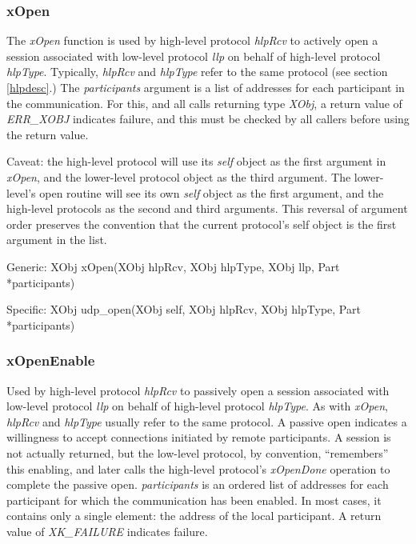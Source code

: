 \subsubsection{xOpen}

\noindent The {\em xOpen} function is used by high-level protocol {\em
hlpRcv} to actively open a session associated with low-level protocol
{\em llp} on behalf of high-level protocol {\em hlpType}. Typically,
{\em hlpRcv} and {\em hlpType} refer to the same protocol 
(see section \ref{hlpdesc}.)  
The {\em participants} 
argument is a list of addresses for each participant in
the communication.  For this, and all calls returning type {\em XObj},
a return value of {\em ERR\_XOBJ} indicates failure, and this must be
checked by all callers before using the return value.

Caveat: the high-level protocol will use its {\em self} object as the
first argument in {\em xOpen}, and the lower-level protocol object as
the third argument.  The lower-level's open routine will see its own
{\em self} object as the first argument, and the high-level protocols
as the second and third arguments.  This reversal of argument order
preserves the convention that the current protocol's self object is
the first argument in the list.

\medskip
{\sanss Generic: }
{\sem XObj} {\bold xOpen}({\sem XObj} {\caps  hlpRcv}, {\sem XObj} {\caps  hlpType}, {\sem XObj} {\caps  llp}, {\sem Part} *{\caps participants})
\medskip

{\sanss Specific: }
{\sem XObj} {\bold udp\_open}({\sem XObj} {\caps self}, {\sem XObj} {\caps  hlpRcv}, {\sem XObj} {\caps  hlpType}, {\sem Part} *{\caps participants})

\subsubsection{xOpenEnable}

\noindent Used by high-level protocol {\em hlpRcv} to passively open a 
session associated with low-level protocol {\em llp} on behalf of
high-level protocol {\em hlpType}. As with {\em xOpen}, {\em hlpRcv}
and {\em hlpType} usually refer to the same protocol. A passive open
indicates a willingness to accept connections initiated by remote
participants.  A session is not actually returned, but the low-level
protocol, by convention, ``remembers'' this enabling, and later calls
the high-level protocol's {\em xOpenDone} operation to complete the
passive open.  {\em participants} is an ordered list of addresses for
each participant for which the communication has been enabled. In most
cases, it contains only a single element: the address of the local
participant.  A return value of {\em XK\_FAILURE} indicates failure.

